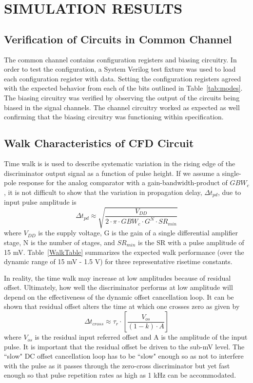 \documentclass[12pt,oneside,final]{siuethesis}
\theoremstyle{definition}
\begin{document}
\chapter{SIMULATION RESULTS}

\section{Verification of Circuits in Common Channel}

\par The common channel contains configuration registers and biasing circuitry. In order to test the configuration, a System Verilog test fixture was used to load each configuration register with data. Setting the configuration registers agreed with the expected behavior from each of the bits outlined in Table~\ref{tab:modes}. The biasing circuitry was verified by observing the output of the circuits being biased in the signal channels. The channel circuitry worked as expected as well confirming that the biasing circuitry was functioning within specification.

\section{Walk Characteristics of CFD Circuit}

\par Time walk is is used to describe systematic variation in the rising edge of the discriminator output signal as a function of pulse height. If we assume a single-pole response for the analog comparator with a gain-bandwidth-product of $GBW_c$, it is not difficult to show that the variation in propagation delay, $\Delta t_{pd}$, due to input pulse amplitude is 
\begin{equation}
\Delta t_{pd} \approx  \sqrt{\frac{V_{DD}}{2 \cdot \pi \cdot GBW_c \cdot G^N \cdot SR_{min}}}
\end{equation}
where $V_{DD}$ is the supply voltage, G is the gain of a single differential amplifier stage, N is the number of stages, and $SR_{min}$ is  the SR with a pulse amplitude of 15 mV.   Table~\ref{WalkTable} summarizes the expected walk performance (over the dynamic range of 15 mV - 1.5 V) for three representative risetime constants.

\par In reality, the time walk may increase at low amplitudes because of residual offset.  Ultimately, how well the discriminator performs at low amplitude will depend on the effectiveness of the dynamic offset cancellation loop. It can be shown that residual offset alters the time at which one crosses zero as given by
\begin{equation}
\Delta t_{cross} \approx \tau_r \cdot \left[ \frac{V_{os}}{(1-k) \cdot A} \right]
\end{equation}
where $V_{os}$ is the residual input referred offset and A is the amplitude of the input pulse. It is important that the residual offset be driven to the sub-mV level.  The ``slow" DC offset cancellation loop has to be ``slow" enough so as not to interfere with the pulse as it passes through the zero-cross discriminator but yet fast enough so that pulse repetition rates as high as 1 kHz can be accommodated. 
\end{document}
